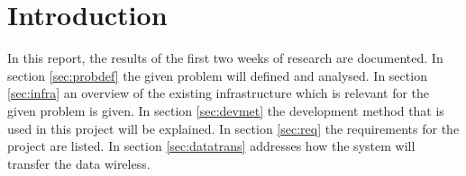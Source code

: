 \section{Introduction}
In this report, the results of the first two weeks of research are documented. In section \ref{sec:probdef} the given problem will defined and analysed. In section \ref{sec:infra} an overview of the existing infrastructure which is relevant for the given problem is given. In section \ref{sec:devmet} the development method that is used in this project will be explained. In section \ref{sec:req} the requirements for the project are listed. In section \ref{sec:datatrans} addresses how the system will transfer the data wireless.